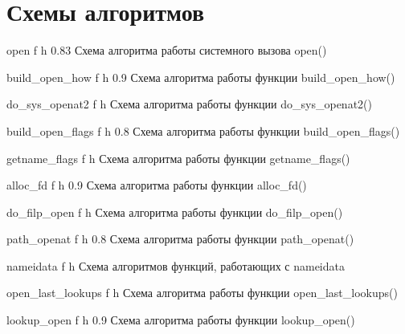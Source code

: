 \chapter{Схемы алгоритмов}

    {open}
    {f} 
    {h} 
    {0.83\textwidth} 
    {Схема алгоритма работы системного вызова open()}


    {build_open_how}
    {f} 
    {h} 
    {0.9\textwidth} 
    {Схема алгоритма работы функции build\_open\_how()}

    {do_sys_openat2}
    {f} 
    {h} 
    {\textwidth} 
    {Схема алгоритма работы функции do\_sys\_openat2()}

    {build_open_flags}
    {f} 
    {h} 
    {0.8\textwidth} 
    {Схема алгоритма работы функции build\_open\_flags()}

    {getname_flags}
    {f} 
    {h} 
    {\textwidth} 
    {Схема алгоритма работы функции getname\_flags()}


    {alloc_fd}
    {f} 
    {h} 
    {0.9\textwidth} 
    {Схема алгоритма работы функции alloc\_fd()}

    {do_filp_open}
    {f} 
    {h} 
    {\textwidth} 
    {Схема алгоритма работы функции do\_filp\_open()}


    {path_openat}
    {f} 
    {h} 
    {0.8\textwidth} 
    {Схема алгоритма работы функции path\_openat()}

    {nameidata}
    {f} 
    {h} 
    {\textwidth} 
    {Схема алгоритмов функций, работающих с nameidata}

    {open_last_lookups}
    {f} 
    {h} 
    {\textwidth} 
    {Схема алгоритма работы функции open\_last\_lookups()}

    {lookup_open}
    {f} 
    {h} 
    {0.9\textwidth} 
    {Схема алгоритма работы функции lookup\_open()}